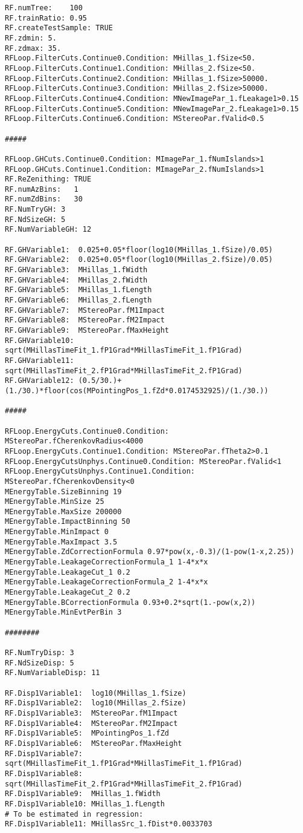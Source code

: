 \begin{lstlisting}
RF.numTree:    100
RF.trainRatio: 0.95
RF.createTestSample: TRUE
RF.zdmin: 5.
RF.zdmax: 35.
RFLoop.FilterCuts.Continue0.Condition: MHillas_1.fSize<50. 
RFLoop.FilterCuts.Continue1.Condition: MHillas_2.fSize<50.
RFLoop.FilterCuts.Continue2.Condition: MHillas_1.fSize>50000. 
RFLoop.FilterCuts.Continue3.Condition: MHillas_2.fSize>50000. 
RFLoop.FilterCuts.Continue4.Condition: MNewImagePar_1.fLeakage1>0.15
RFLoop.FilterCuts.Continue5.Condition: MNewImagePar_2.fLeakage1>0.15 
RFLoop.FilterCuts.Continue6.Condition: MStereoPar.fValid<0.5

#####

RFLoop.GHCuts.Continue0.Condition: MImagePar_1.fNumIslands>1
RFLoop.GHCuts.Continue1.Condition: MImagePar_2.fNumIslands>1
RF.ReZenithing: TRUE
RF.numAzBins:   1
RF.numZdBins:   30
RF.NumTryGH: 3
RF.NdSizeGH: 5
RF.NumVariableGH: 12

RF.GHVariable1:  0.025+0.05*floor(log10(MHillas_1.fSize)/0.05)
RF.GHVariable2:  0.025+0.05*floor(log10(MHillas_2.fSize)/0.05)
RF.GHVariable3:  MHillas_1.fWidth
RF.GHVariable4:  MHillas_2.fWidth
RF.GHVariable5:  MHillas_1.fLength
RF.GHVariable6:  MHillas_2.fLength
RF.GHVariable7:  MStereoPar.fM1Impact
RF.GHVariable8:  MStereoPar.fM2Impact
RF.GHVariable9:  MStereoPar.fMaxHeight
RF.GHVariable10: sqrt(MHillasTimeFit_1.fP1Grad*MHillasTimeFit_1.fP1Grad)
RF.GHVariable11: sqrt(MHillasTimeFit_2.fP1Grad*MHillasTimeFit_2.fP1Grad)
RF.GHVariable12: (0.5/30.)+(1./30.)*floor(cos(MPointingPos_1.fZd*0.0174532925)/(1./30.))

#####

RFLoop.EnergyCuts.Continue0.Condition: MStereoPar.fCherenkovRadius<4000
RFLoop.EnergyCuts.Continue1.Condition: MStereoPar.fTheta2>0.1
RFLoop.EnergyCutsUnphys.Continue0.Condition: MStereoPar.fValid<1
RFLoop.EnergyCutsUnphys.Continue1.Condition: MStereoPar.fCherenkovDensity<0
MEnergyTable.SizeBinning 19
MEnergyTable.MinSize 25
MEnergyTable.MaxSize 200000
MEnergyTable.ImpactBinning 50
MEnergyTable.MinImpact 0
MEnergyTable.MaxImpact 3.5
MEnergyTable.ZdCorrectionFormula 0.97*pow(x,-0.3)/(1-pow(1-x,2.25))
MEnergyTable.LeakageCorrectionFormula_1 1-4*x*x
MEnergyTable.LeakageCut_1 0.2
MEnergyTable.LeakageCorrectionFormula_2 1-4*x*x
MEnergyTable.LeakageCut_2 0.2
MEnergyTable.BCorrectionFormula 0.93+0.2*sqrt(1.-pow(x,2))
MEnergyTable.MinEvtPerBin 3

########

RF.NumTryDisp: 3
RF.NdSizeDisp: 5
RF.NumVariableDisp: 11

RF.Disp1Variable1:  log10(MHillas_1.fSize)
RF.Disp1Variable2:  log10(MHillas_2.fSize)
RF.Disp1Variable3:  MStereoPar.fM1Impact
RF.Disp1Variable4:  MStereoPar.fM2Impact
RF.Disp1Variable5:  MPointingPos_1.fZd
RF.Disp1Variable6:  MStereoPar.fMaxHeight
RF.Disp1Variable7:  sqrt(MHillasTimeFit_1.fP1Grad*MHillasTimeFit_1.fP1Grad)
RF.Disp1Variable8:  sqrt(MHillasTimeFit_2.fP1Grad*MHillasTimeFit_2.fP1Grad)
RF.Disp1Variable9:  MHillas_1.fWidth
RF.Disp1Variable10: MHillas_1.fLength
# To be estimated in regression:
RF.Disp1Variable11: MHillasSrc_1.fDist*0.0033703


\end{lstlisting}
